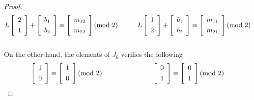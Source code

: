 \documentclass[article,dvisp]{amsart}
\theoremstyle{definition}
\theoremstyle{remark}
\numberwithin{equation}{section}
\theoremstyle{lemma}
\begin{document}
\begin{proof}
 $$L\left[{\begin{array}{*{20}c}
    2\vspace{.05in}\\
    1 
 \end{array}}\right]+\left[{\begin{array}{*{20}c}
    b_{1}\vspace{.05in}\\
    b_{2} 
 \end{array}}\right]\equiv\left[{\begin{array}{*{20}c}
    m_{12} \vspace{.05in}\\
    m_{22}
 \end{array}}\right](\text{mod}\ 2)\hspace{.4in}
 L\left[{\begin{array}{*{20}c}
    1\vspace{.05in}\\
    2 
 \end{array}}\right]+\left[{\begin{array}{*{20}c}
    b_{1}\vspace{.05in}\\
    b_{2} 
 \end{array}}\right]\equiv\left[{\begin{array}{*{20}c}
    m_{11} \vspace{.05in}\\
    m_{21}
 \end{array}}\right](\text{mod}\ 2)$$\\
On the other hand, the elements of $J_{6}$ verifies the following
$$\left[{\begin{array}{*{20}c}
    1\vspace{.05in}\\
    0 
 \end{array}}\right]\equiv\left[{\begin{array}{*{20}c}
    1 \vspace{.05in}\\
    0
 \end{array}}\right](\text{mod}\ 2)\hspace{1in}
 \left[{\begin{array}{*{20}c}
    0\vspace{.05in}\\
    1 
 \end{array}}\right]\equiv\left[{\begin{array}{*{20}c}
    0 \vspace{.05in}\\
    1
 \end{array}}\right](\text{mod}\ 2)$$
 

\end{proof}
\end{document}
